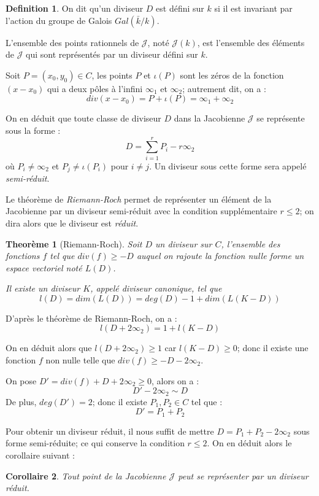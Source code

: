 \documentclass[a4paper,12pt]{article}
\newtheorem{theoreme}{Theorème}[section]
\newtheorem{corollaire}[theoreme]{Corollaire}
\theoremstyle{definition}
\newtheorem{definition}{Definition}[section]
\theoremstyle{remark}
\numberwithin{equation}{section}
\begin{document}
\begin{definition}
On dit qu'un diviseur $D$ est défini sur $k$ si il est invariant par l'action du groupe de Galois $Gal(\bar{k}/k)$.

L'ensemble des points rationnels de $\mathcal{J}$, noté $\mathcal{J}(k)$, est l'ensemble des éléments de $\mathcal{J}$ qui sont représentés par un diviseur défini sur $k$.
\end{definition}

Soit $P=(x_0,y_0) \in C$, les points $P$ et $\iota(P)$ sont les zéros de la fonction $(x-x_0)$ qui a deux pôles à l'infini $\infty_1$ et $\infty_2$; autrement dit, on a :
$$div(x-x_0) = P + \iota(P) = \infty_1 + \infty_2$$

On en déduit que toute classe de diviseur $D$ dans la Jacobienne $\mathcal{J}$ se représente sous la forme :
$$D = \sum_{i=1}^r{P_i} - r\infty_2$$
où $P_i \neq \infty_2$ et $P_j \neq \iota(P_i)$ pour $i \neq j$. Un diviseur sous cette forme sera appelé \emph{semi-réduit}.

Le théorème de \emph{Riemann-Roch} permet de représenter un élément de la Jacobienne par un diviseur semi-réduit avec la condition supplémentaire $r \leq 2$; on dira alors que le diviseur est \emph{réduit}.
\begin{theoreme}[Riemann-Roch]
Soit $D$ un diviseur sur $C$, l'ensemble des fonctions $f$ tel que $div(f) \geq -D$ auquel on rajoute la fonction nulle forme un espace vectoriel noté $L(D)$.

Il existe un diviseur $K$, appelé diviseur canonique, tel que
$$l(D) = dim (L(D)) = deg(D) - 1 + dim (L(K - D))$$
\end{theoreme}

D'après le théorème de Riemann-Roch, on a :
$$l(D+2\infty_2) = 1 + l(K-D)$$

On en déduit alors que $l(D+2\infty_2) \geq 1$ car $l(K-D) \geq 0$; donc il existe une fonction $f$ non nulle telle que $div(f) \geq -D - 2\infty_2$.

On pose $D' = div(f) + D + 2\infty_2 \geq 0$, alors on a :
$$D' - 2\infty_2 \sim D$$
De plus, $deg(D') = 2$; donc il existe $P_1, P_2 \in C$ tel que :
$$D' = P_1 + P_2$$

Pour obtenir un diviseur réduit, il nous suffit de mettre $D = P_1 + P_2 - 2\infty_2$ sous forme semi-réduite; ce qui conserve la condition $r \leq 2$. On en déduit alors le corollaire suivant :

\begin{corollaire}
\label{div_red}
Tout point de la Jacobienne $\mathcal{J}$ peut se représenter par un diviseur réduit.
\end{corollaire}
\end{document}

